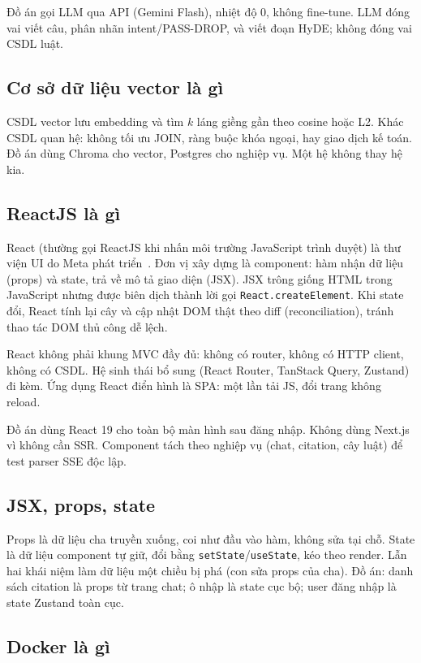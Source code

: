 Đồ án gọi LLM qua API (Gemini Flash), nhiệt độ 0, không fine-tune. LLM đóng vai
viết câu, phân nhãn intent/PASS-DROP, và viết đoạn HyDE; không đóng vai CSDL
luật.

\subsection{Cơ sở dữ liệu vector là gì}

CSDL vector lưu embedding và tìm $k$ láng giềng gần theo cosine hoặc L2. Khác
CSDL quan hệ: không tối ưu JOIN, ràng buộc khóa ngoại, hay giao dịch kế toán.
Đồ án dùng Chroma cho vector, Postgres cho nghiệp vụ. Một hệ không thay hệ kia.

\subsection{ReactJS là gì}

React (thường gọi ReactJS khi nhấn môi trường JavaScript trình duyệt) là thư
viện UI do Meta phát triển~\cite{react}. Đơn vị xây dựng là component: hàm nhận
dữ liệu (props) và state, trả về mô tả giao diện (JSX). JSX trông giống HTML
trong JavaScript nhưng được biên dịch thành lời gọi
\texttt{React.createElement}. Khi state đổi, React tính lại cây và cập nhật DOM
thật theo diff (reconciliation), tránh thao tác DOM thủ công dễ lệch.

React không phải khung MVC đầy đủ: không có router, không có HTTP client, không
có CSDL. Hệ sinh thái bổ sung (React Router, TanStack Query, Zustand) đi kèm.
Ứng dụng React điển hình là SPA: một lần tải JS, đổi trang không reload.

Đồ án dùng React 19 cho toàn bộ màn hình sau đăng nhập. Không dùng Next.js vì
không cần SSR. Component tách theo nghiệp vụ (chat, citation, cây luật) để test
parser SSE độc lập.

\subsection{JSX, props, state}

Props là dữ liệu cha truyền xuống, coi như đầu vào hàm, không sửa tại chỗ.
State là dữ liệu component tự giữ, đổi bằng \texttt{setState}/\texttt{useState},
kéo theo render. Lẫn hai khái niệm làm dữ liệu một chiều bị phá (con sửa props
của cha). Đồ án: danh sách citation là props từ trang chat; ô nhập là state
cục bộ; user đăng nhập là state Zustand toàn cục.

\subsection{Docker là gì}

